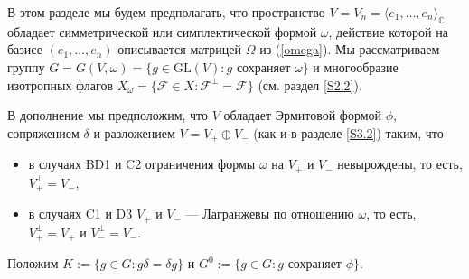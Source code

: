 \documentclass{amsart}
\theoremstyle{definition}
\begin{document}
В этом разделе мы будем предполагать, что пространство $V=V_n=\langle e_1,\ldots,e_n\rangle_\mathbb{C}$ обладает симметрической или симплектической формой $\omega$, действие которой на базисе $(e_1,\ldots,e_n)$ описывается матрицей $\Omega$
из (\ref{omega}).
Мы рассматриваем группу $G=G(V,\omega)=\{g\in\mathrm{GL}(V):\mbox{$g$ сохраняет $\omega$}\}$ и многообразие изотропных флагов $X_\omega=\{\mathcal{F}\in X:\mathcal{F}^\perp=\mathcal{F}\}$
(см. раздел \ref{S2.2}).

В дополнение мы предположим, что $V$ обладает Эрмитовой формой $\phi$, сопряжением $\delta$ и разложением $V=V_+\oplus V_-$ (как и в разделе \ref{S3.2}) таким, что
\begin{itemize}
\item в случаях BD1 и C2 ограничения формы $\omega$ на $V_+$ и $V_-$ невырождены, то есть, $V_+^\perp=V_-$,
\item в случаях C1 и D3 $V_+$ и $V_-$ --- Лагранжевы по отношению $\omega$, то есть, $V_+^\perp=V_+$ и $V_-^\perp=V_-$.
\end{itemize}
Положим $K:=\{g\in G:g\delta=\delta g\}$ и $G^0:=\{g\in G:\mbox{$g$ сохраняет $\phi$}\}$.
\end{document}

